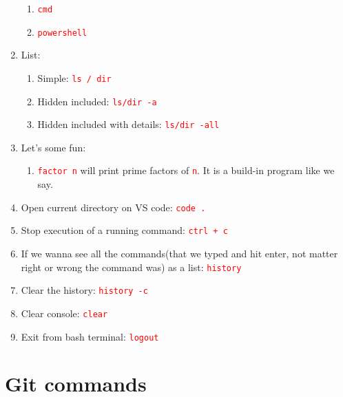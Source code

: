 \documentclass[12 pt, letterpaper]{extarticle}
\newcommand{\R}{\textcolor{red}} %
\newcommand{\T}{\texttt}
\begin{document}
\begin{enumerate}
\begin{enumerate}
			\item \R{\T{cmd}}
			\item \R{\T{powershell}}
		\end{enumerate}
	
	\item List:
		\begin{enumerate}
			\item Simple: \R{\T{ls / dir}}
			\item Hidden included: \R{\T{ls/dir -a}}
			\item Hidden included with details: \R{\T{ls/dir -all}}
		\end{enumerate}
		
	\item Let's some fun:
		\begin{enumerate}
			\item \R{\T{factor n}} will print prime factors of \R{\T{n}}. It is a build-in program like we say.
		\end{enumerate}
	
	\item Open current directory on VS code: \R{\T{code .}}
	\item Stop execution of a running command: \R{\T{ctrl + c}}
	\item If we wanna see all the commands(that we typed and hit enter, not matter right or wrong the command was) as a list: \R{\T{history}}
	\item Clear the history: \R{\T{history -c}}
	\item Clear console: \R{\T{clear}}
	\item Exit from bash terminal: \R{\T{logout}}
\end{enumerate}

\section*{Git commands}
\end{document}
